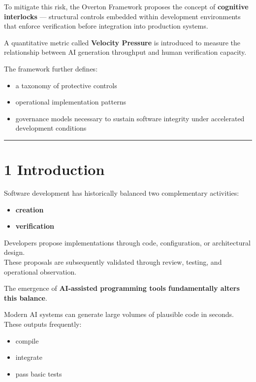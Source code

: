 \documentclass[
]{article}
\providecommand{\tightlist}{%
  \setlength{\itemsep}{0pt}\setlength{\parskip}{0pt}}
\begin{document}
To mitigate this risk, the Overton Framework proposes the concept of
\textbf{cognitive interlocks} --- structural controls embedded within
development environments that enforce verification before integration
into production systems.

A quantitative metric called \textbf{Velocity Pressure} is introduced to
measure the relationship between AI generation throughput and human
verification capacity.

The framework further defines:

\begin{itemize}
\tightlist
\item
  a taxonomy of protective controls
\item
  operational implementation patterns
\item
  governance models necessary to sustain software integrity under
  accelerated development conditions
\end{itemize}

\begin{center}\rule{0.5\linewidth}{0.5pt}\end{center}

\section{1 Introduction}\label{1-introduction}

Software development has historically balanced two complementary
activities:

\begin{itemize}
\tightlist
\item
  \textbf{creation}
\item
  \textbf{verification}
\end{itemize}

Developers propose implementations through code, configuration, or
architectural design.\\
These proposals are subsequently validated through review, testing, and
operational observation.

The emergence of \textbf{AI-assisted programming tools fundamentally
alters this balance}.

Modern AI systems can generate large volumes of plausible code in
seconds. These outputs frequently:

\begin{itemize}
\tightlist
\item
  compile
\item
  integrate
\item
  pass basic tests
\end{itemize}
\end{document}
